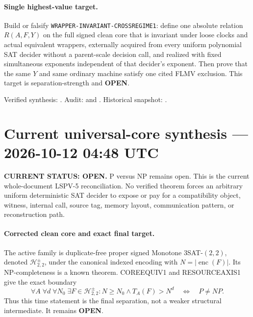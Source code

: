 \documentclass[11pt]{article}
\newcommand{\statusopen}{\textcolor{openstatus}{\textbf{OPEN}}}
\begin{document}
\paragraph{Single highest-value target.}
Build or falsify \texttt{WRAPPER-INVARIANT-CROSSREGIME1}: define one absolute
relation \(R(A,F,Y)\) on the full signed clean core that is invariant under
loose clocks and actual equivalent wrappers, externally acquired from every
uniform polynomial SAT decider without a parent-scale decision call, and
realized with fixed simultaneous exponents independent of that decider's
exponent.  Then prove that the same \(Y\) and same ordinary machine satisfy
one cited FLMV exclusion.  This target is separation-strength and
\statusopen.

Verified synthesis:
.
Audit:
and
.
Historical snapshot:
.

\clearpage


\section{Current universal-core synthesis --- 2026-10-12 04:48 UTC}

\begin{statusbox}
\textbf{CURRENT STATUS: OPEN.} P versus NP remains open.  This is the current
whole-document LSPV-5 reconciliation.  No verified theorem forces an arbitrary
uniform deterministic SAT decider to expose or pay for a compatibility
object, witness, internal call, source tag, memory layout, communication
pattern, or reconstruction path.
\end{statusbox}

\paragraph{Corrected clean core and exact final target.}
The active family is duplicate-free proper signed Monotone
\(3\)SAT-\((2,2)\), denoted \(\mathcal H^\pm_{2,2}\), under the canonical
indexed encoding with \(N=|\operatorname{enc}(F)|\).  Its NP-completeness is
a known theorem.  COREEQUIV1 and RESOURCEAXIS1 give the exact boundary
\[
 \forall A\;\forall d\;\forall N_0\;\exists F\in\mathcal H^\pm_{2,2}:
 N\ge N_0\land T_A(F)>N^d
 \quad\Longleftrightarrow\quad P\ne NP.
\]
Thus this time statement is the final separation, not a weaker structural
intermediate.  It remains \statusopen.
\end{document}
